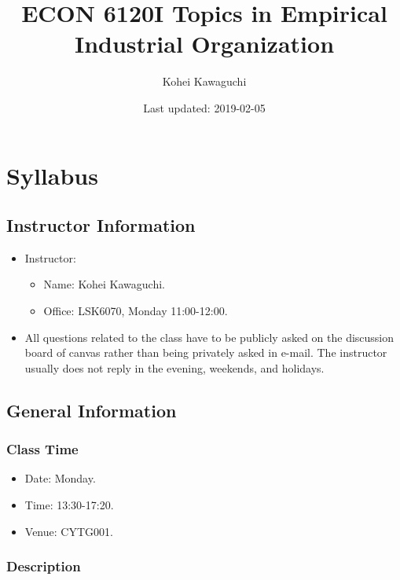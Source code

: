 \documentclass[]{book}
\title{ECON 6120I Topics in Empirical Industrial Organization}
\author{Kohei Kawaguchi}
\date{Last updated: 2019-02-05}
\providecommand{\tightlist}{%
  \setlength{\itemsep}{0pt}\setlength{\parskip}{0pt}}
\theoremstyle{definition}
\theoremstyle{definition}
\theoremstyle{definition}
\theoremstyle{remark}
\begin{document}
\maketitle

{
\setcounter{tocdepth}{1}
\tableofcontents
}
\chapter{Syllabus}\label{syllabus}

\section{Instructor Information}\label{instructor-information}

\begin{itemize}
\tightlist
\item
  Instructor:

  \begin{itemize}
  \tightlist
  \item
    Name: Kohei Kawaguchi.
  \item
    Office: LSK6070, Monday 11:00-12:00.
  \end{itemize}
\item
  All questions related to the class have to be publicly asked on the
  discussion board of canvas rather than being privately asked in
  e-mail. The instructor usually does not reply in the evening,
  weekends, and holidays.
\end{itemize}

\section{General Information}\label{general-information}

\subsection{Class Time}\label{class-time}

\begin{itemize}
\tightlist
\item
  Date: Monday.
\item
  Time: 13:30-17:20.
\item
  Venue: CYTG001.
\end{itemize}

\subsection{Description}\label{description}
\end{document}
